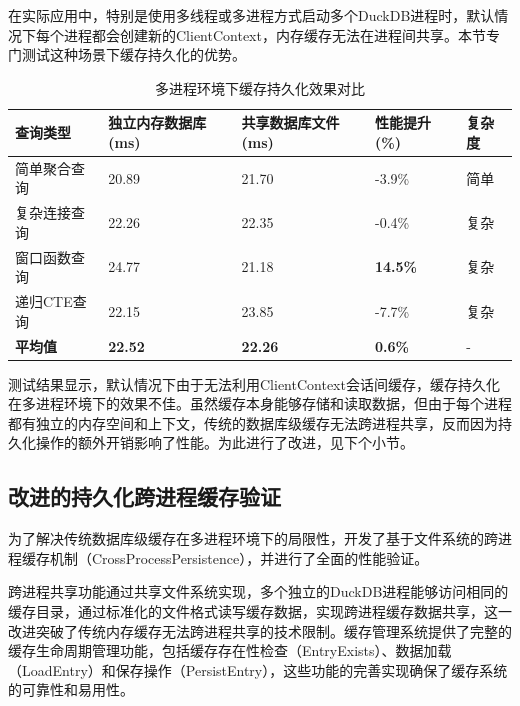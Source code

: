 在实际应用中，特别是使用多线程或多进程方式启动多个DuckDB进程时，默认情况下每个进程都会创建新的ClientContext，内存缓存无法在进程间共享。本节专门测试这种场景下缓存持久化的优势。

\begin{table}[!htb]
    \caption{多进程环境下缓存持久化效果对比}
    \label{table5_2}
    \centering
    \begin{tabular}{p{3cm}p{2.5cm}p{2.5cm}p{2.5cm}p{2.5cm}}
        \hline
        查询类型 & 独立内存数据库(ms) & 共享数据库文件(ms) & 性能提升(\%) & 复杂度 \\
        \hline
        简单聚合查询 & 20.89 & 21.70 & -3.9\% & 简单 \\
        复杂连接查询 & 22.26 & 22.35 & -0.4\% & 复杂 \\
        窗口函数查询 & 24.77 & 21.18 & \textbf{14.5\%} & 复杂 \\
        递归CTE查询 & 22.15 & 23.85 & -7.7\% & 复杂 \\
        \textbf{平均值} & \textbf{22.52} & \textbf{22.26} & \textbf{0.6\%} & - \\
        \hline
    \end{tabular}
\end{table}

测试结果显示，默认情况下由于无法利用ClientContext会话间缓存，缓存持久化在多进程环境下的效果不佳。虽然缓存本身能够存储和读取数据，但由于每个进程都有独立的内存空间和上下文，传统的数据库级缓存无法跨进程共享，反而因为持久化操作的额外开销影响了性能。为此进行了改进，见下个小节。

\subsection{改进的持久化跨进程缓存验证}

为了解决传统数据库级缓存在多进程环境下的局限性，开发了基于文件系统的跨进程缓存机制（CrossProcessPersistence），并进行了全面的性能验证。

跨进程共享功能通过共享文件系统实现，多个独立的DuckDB进程能够访问相同的缓存目录，通过标准化的文件格式读写缓存数据，实现跨进程缓存数据共享，这一改进突破了传统内存缓存无法跨进程共享的技术限制。缓存管理系统提供了完整的缓存生命周期管理功能，包括缓存存在性检查（EntryExists）、数据加载（LoadEntry）和保存操作（PersistEntry），这些功能的完善实现确保了缓存系统的可靠性和易用性。

